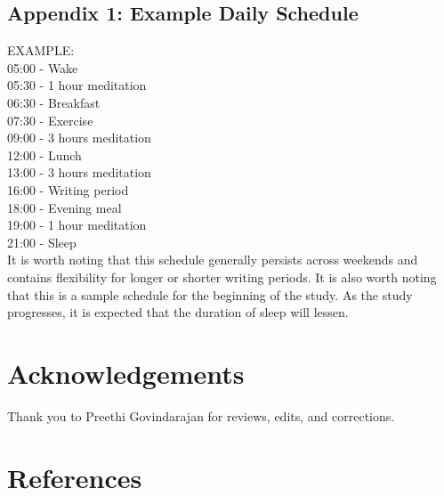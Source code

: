\documentclass[a4paper, amsfonts, amssymb, amsmath, reprint, showkeys, nofootinbib, twoside]{revtex4-1}
\begin{document}
\subsection{Appendix 1: Example Daily Schedule}

EXAMPLE: \\
05:00 - Wake \\
05:30 - 1 hour meditation \\
06:30 - Breakfast \\
07:30 - Exercise \\
09:00 - 3 hours meditation \\
12:00 - Lunch \\
13:00 - 3 hours meditation \\
16:00 - Writing period \\
18:00 - Evening meal \\
19:00 - 1 hour meditation \\
21:00 - Sleep \\

It is worth noting that this schedule generally persists across weekends and contains
flexibility for longer or shorter writing periods.
It is also worth noting that this is a sample schedule for the beginning of the study.
As the study progresses, it is expected that the duration of sleep will lessen.

\section*{Acknowledgements}

Thank you to Preethi Govindarajan for reviews, edits, and corrections.


\section*{References}

{}


% 
\end{document}
